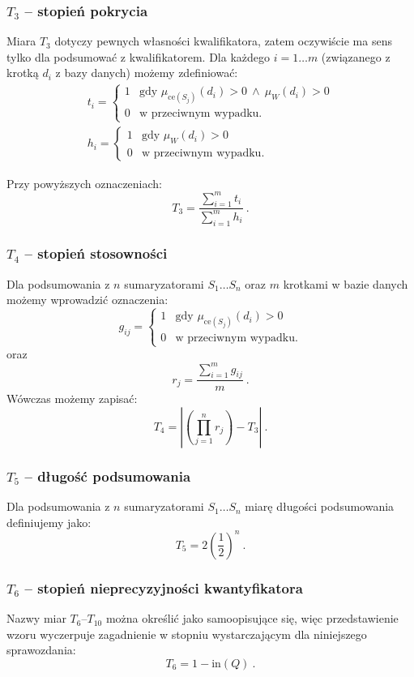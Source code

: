 \documentclass{classrep}
\begin{document}
\subsubsection{\(T_3\) -- stopień pokrycia}
Miara \(T_3\) dotyczy pewnych własności kwalifikatora,
zatem oczywiście ma sens tylko dla podsumować z kwalifikatorem.
Dla każdego \(i=1\ldots m\) (związanego z krotką \(d_i\) z bazy
danych) możemy zdefiniować:
\[
\begin{array}{l}
t_i = \begin{cases} 1 & \mbox{gdy } \mu_{\mathrm{ce}(S_j)}(d_i) > 0 ~ \wedge ~ \mu_{W}(d_i) > 0 \\
0 & \mbox{w przeciwnym wypadku.}
\end{cases} \\
h_i = \begin{cases}
1 & \mbox{gdy } \mu_{W}(d_i) > 0 \\
0 & \mbox{w przeciwnym wypadku.}
\end{cases}
\end{array}\]

Przy powyższych oznaczeniach:
\[T_3 = \frac{\sum_{i=1}^{m} t_i}{\sum_{i=1}^{m} h_i} ~\mbox{.}\]

\subsubsection{\(T_4\) -- stopień stosowności}
Dla podsumowania z \(n\) sumaryzatorami \(S_1 \ldots S_n\)
oraz \(m\) krotkami w bazie danych możemy wprowadzić oznaczenia:
\[g_{ij} = \begin{cases}
1 & \mbox{gdy } \mu_{\mathrm{ce}(S_j)}(d_i) > 0 \\
0 & \mbox{w przeciwnym wypadku.}
\end{cases}\]
oraz
\[r_j = \frac{\sum_{i=1}^{m} g_{ij}}{m} ~\mbox{.}\]
Wówczas możemy zapisać:
\[T_4 = \left|\left( \prod_{j=1}^{n} r_j \right) - T_3\right| ~\mbox{.}\]

\subsubsection{\(T_5\) -- długość podsumowania}
Dla podsumowania z \(n\) sumaryzatorami \(S_1 \ldots S_n\)
miarę długości podsumowania definiujemy jako:
\[T_5 = 2\left(\frac{1}{2}\right)^{n} ~\mbox{.}\]

\subsubsection{\(T_6\) -- stopień nieprecyzyjności kwantyfikatora}
Nazwy miar \(T_6\)--\(T_{10}\) można określić jako samoopisujące się,
więc przedstawienie wzoru wyczerpuje zagadnienie w stopniu wystarczającym
dla niniejszego sprawozdania:
\[T_6 = 1-\mathrm{in}(Q) ~\mbox{.}\]
\end{document}
